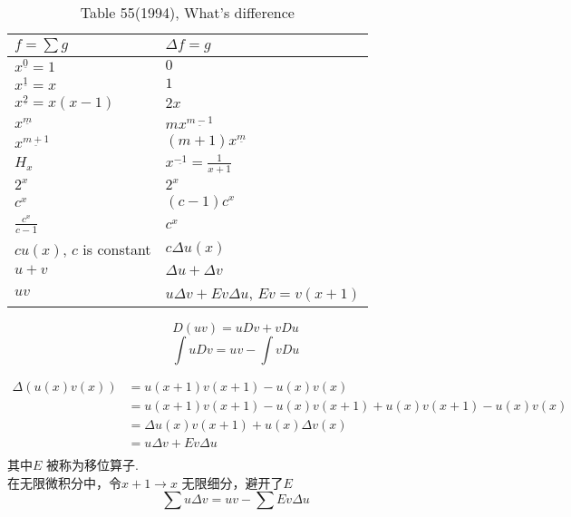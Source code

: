 \documentclass[mode=geye]{elegantnote}
\newcommand{\fallingfactorial}[1]{%
  ^{\underline{#1}}%
}
\begin{document}
\begin{table}[htbp]
	\centering
	\small
	\caption{Table 55(1994), What's difference}
	\begin{tabular}{l|l}
		\toprule
        $ f=\sum g $ & $ \Delta f= g $ \\
		\midrule
        $ x\fallingfactorial{0}=1 $ & $ 0 $ \\
        $ x\fallingfactorial{1}=x $ & $ 1 $ \\
        $ x\fallingfactorial{2}=x(x-1) $ & $ 2x $ \\
        $ x\fallingfactorial{m}   $ & $ m x\fallingfactorial{m-1} $ \\
        $ x\fallingfactorial{m+1} $ & $ (m+1) x\fallingfactorial{m} $ \\
        $ H_x $ & $ x\fallingfactorial{-1}=\frac{1}{x+1} $ \\
        $ 2^x $ & $ 2^x $ \\
        $ c^x $ & $ (c-1) c^x $ \\
        $ \frac{c^x}{c-1} $ & $  c^x $ \\
        $ cu(x) $, $ c $ is constant  & $ c\Delta u(x) $ \\
        $ u+v $ & $ \Delta u+\Delta v $ \\
        $ uv $ & $ u\Delta v+Ev \Delta u $, $ Ev=v(x+1) $  \\
		\bottomrule
	\end{tabular}%
	\label{tab:55rightside}%
\end{table}%
\begin{equation}
    D(uv)=uDv+vDu
\end{equation}
\begin{equation}
    \int uDv = uv - \int vDu
\end{equation}

\begin{equation}
    \begin{array}{rl}
        \Delta (u(x)v(x))
        &=u(x+1)v(x+1)-u(x)v(x)\\
        &=u(x+1)v(x+1)-u(x)v(x+1)+u(x)v(x+1) -u(x)v(x)\\
        &=\Delta u(x)v(x+1)+u(x)\Delta v(x)\\
        &=u\Delta v+Ev \Delta u\\
    \end{array}
\end{equation}
其中$ E $ 被称为移位算子.\\
在无限微积分中，令$ x+1 \rightarrow x $ 无限细分，避开了$ E $ 
\begin{equation}
    \sum u\Delta v = uv - \sum Ev \Delta u
\end{equation} 
\end{document}
